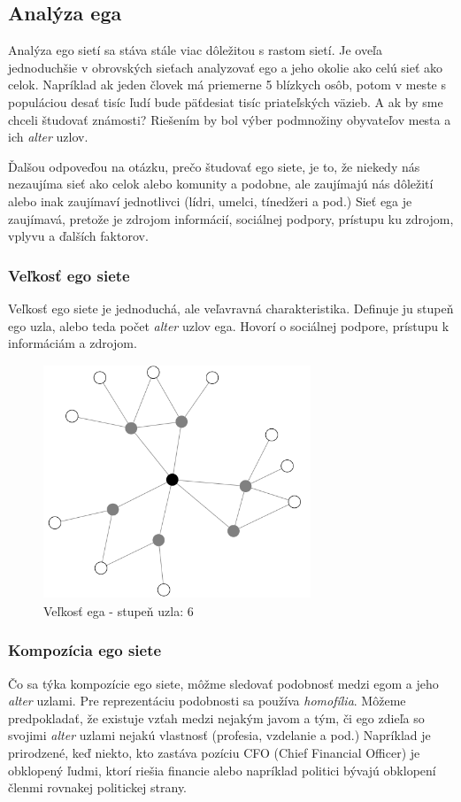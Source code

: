 \documentclass[slovak,master,public,dept460,male,cpdeclaration,oneside]{diploma}
\begin{document}
\subsection{Analýza ega}
Analýza ego sietí sa stáva stále viac dôležitou s rastom sietí. Je oveľa jednoduchšie v obrovských sieťach analyzovať ego a jeho okolie ako celú sieť ako celok. Napríklad ak jeden človek má priemerne 5 blízkych osôb, potom v meste s populáciou desať tisíc ľudí bude päťdesiat tisíc priateľských väzieb. A ak by sme chceli študovať známosti? Riešením by bol výber podmnožiny obyvateľov mesta a ich \textit{alter} uzlov.


Ďalšou odpoveďou na otázku, prečo študovať ego siete, je to, že niekedy nás nezaujíma sieť ako celok alebo komunity a podobne, ale zaujímajú nás dôležití alebo inak zaujímaví jednotlivci (lídri, umelci, tínedžeri a pod.) Sieť ega je zaujímavá, pretože je zdrojom informácií, sociálnej podpory, prístupu ku zdrojom, vplyvu a ďalších faktorov.

\subsubsection{Veľkosť ego siete}
Veľkosť ego siete je jednoduchá, ale veľavravná charakteristika. Definuje ju stupeň ego uzla, alebo teda počet \textit{alter} uzlov ega. Hovorí o sociálnej podpore, prístupu k informáciám a zdrojom.


\begin{figure}[H]
\centering
\includegraphics[width=8cm, height=7cm]{figures/egonet}
\caption{Veľkosť ega - stupeň uzla: 6}
\end{figure}

\subsubsection{Kompozícia ego siete}
Čo sa týka kompozície ego siete, môžme sledovať podobnosť medzi egom a jeho \textit{alter} uzlami. Pre reprezentáciu podobnosti sa používa \textit{homofília}. Môžeme predpokladať, že existuje vzťah medzi nejakým javom a tým, či ego zdieľa so svojimi \textit{alter} uzlami nejakú vlastnosť (profesia, vzdelanie a pod.) Napríklad je prirodzené, keď niekto, kto zastáva pozíciu CFO (Chief Financial Officer) je obklopený ľudmi, ktorí riešia financie alebo napríklad politici bývajú obklopení členmi rovnakej politickej strany. 
\end{document}

